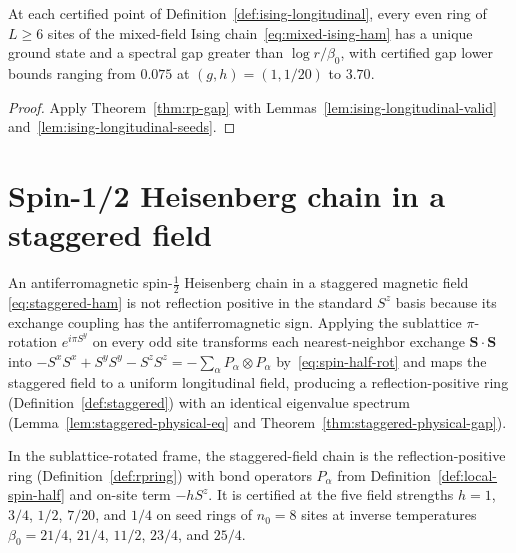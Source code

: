 \begin{theorem}
  \label{thm:ising-longitudinal-gap}
  \leanok
  At each certified point of Definition~\ref{def:ising-longitudinal}, every even ring of
  \(L \ge 6\) sites of the mixed-field Ising chain~\eqref{eq:mixed-ising-ham} has a unique ground
  state and a spectral gap greater than \(\log r / \beta_0\), with certified gap lower bounds
  ranging from \(0.075\) at \((g, h) = (1, 1/20)\) to \(3.70\).
\end{theorem}
\begin{proof}
  \leanok
  Apply Theorem~\ref{thm:rp-gap} with Lemmas~\ref{lem:ising-longitudinal-valid}
  and~\ref{lem:ising-longitudinal-seeds}.
\end{proof}

\section{Spin-1/2 Heisenberg chain in a staggered field}

An antiferromagnetic spin-\(\tfrac12\) Heisenberg chain in a staggered magnetic field
\eqref{eq:staggered-ham} is not reflection positive in the standard \(S^z\) basis because its
exchange coupling has the antiferromagnetic sign. Applying the sublattice \(\pi\)-rotation
\(e^{i\pi S^y}\) on every odd site transforms each nearest-neighbor exchange
\(\mathbf S \cdot \mathbf S\) into \(-S^xS^x + S^yS^y - S^zS^z = -\sum_\alpha P_\alpha \otimes
P_\alpha\) by~\eqref{eq:spin-half-rot} and maps the staggered field to a uniform longitudinal
field, producing a reflection-positive ring (Definition~\ref{def:staggered}) with an identical
eigenvalue spectrum (Lemma~\ref{lem:staggered-physical-eq} and
Theorem~\ref{thm:staggered-physical-gap}).

\begin{definition}
  \label{def:staggered}
  \leanok
  In the sublattice-rotated frame, the staggered-field chain is the reflection-positive ring
  (Definition~\ref{def:rpring}) with bond operators \(P_\alpha\) from
  Definition~\ref{def:local-spin-half} and on-site term \(-h S^z\). It is certified at the five
  field strengths \(h = 1\), \(3/4\), \(1/2\), \(7/20\), and \(1/4\) on seed rings of \(n_0 = 8\)
  sites at inverse temperatures \(\beta_0 = 21/4\), \(21/4\), \(11/2\), \(23/4\), and \(25/4\).
\end{definition}

